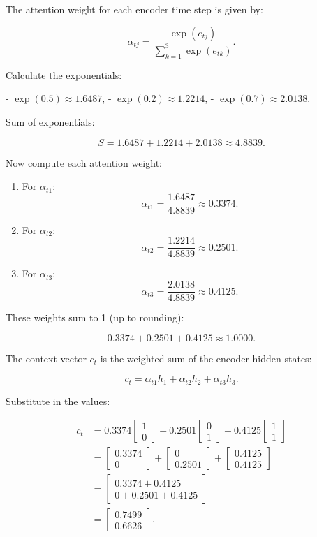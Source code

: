 The attention weight for each encoder time step is given by:

\[
\alpha_{tj} = \frac{\exp(e_{tj})}{\sum_{k=1}^{3} \exp(e_{tk})}.
\]

Calculate the exponentials:

- \(\exp(0.5) \approx 1.6487\),
- \(\exp(0.2) \approx 1.2214\),
- \(\exp(0.7) \approx 2.0138\).

Sum of exponentials:

\[
S = 1.6487 + 1.2214 + 2.0138 \approx 4.8839.
\]

Now compute each attention weight:
\begin{enumerate}
	\item For \( \alpha_{t1} \):
   \[
   \alpha_{t1} = \frac{1.6487}{4.8839} \approx 0.3374.
   \]
\item For \( \alpha_{t2} \):
   \[
   \alpha_{t2} = \frac{1.2214}{4.8839} \approx 0.2501.
   \]
\item For \( \alpha_{t3} \):
   \[
   \alpha_{t3} = \frac{2.0138}{4.8839} \approx 0.4125.
   \]
\end{enumerate}

These weights sum to 1 (up to rounding):

\[
0.3374 + 0.2501 + 0.4125 \approx 1.0000.
\]

The context vector \( c_t \) is the weighted sum of the encoder hidden states:

\[
c_t = \alpha_{t1} h_1 + \alpha_{t2} h_2 + \alpha_{t3} h_3.
\]

Substitute in the values:

\[
\begin{aligned}
c_t &= 0.3374 \begin{bmatrix} 1 \\ 0 \end{bmatrix} 
+ 0.2501 \begin{bmatrix} 0 \\ 1 \end{bmatrix} 
+ 0.4125 \begin{bmatrix} 1 \\ 1 \end{bmatrix} \\
&= \begin{bmatrix} 0.3374 \\ 0 \end{bmatrix} 
+ \begin{bmatrix} 0 \\ 0.2501 \end{bmatrix} 
+ \begin{bmatrix} 0.4125 \\ 0.4125 \end{bmatrix} \\
&= \begin{bmatrix} 0.3374 + 0.4125 \\ 0 + 0.2501 + 0.4125 \end{bmatrix} \\
&= \begin{bmatrix} 0.7499 \\ 0.6626 \end{bmatrix}.
\end{aligned}
\]

